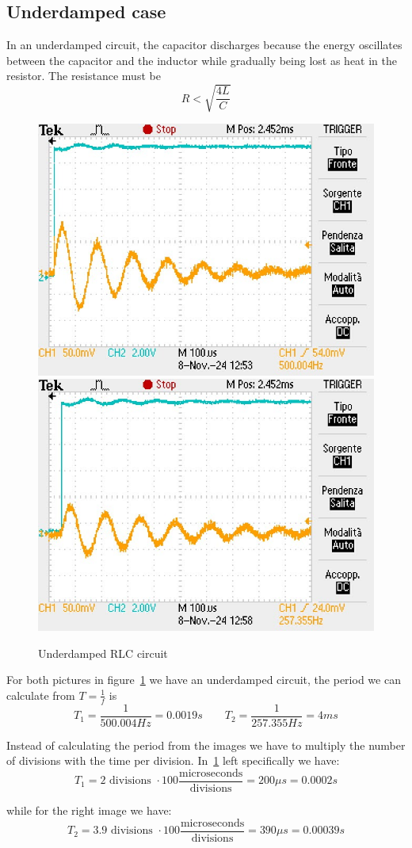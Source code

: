 \documentclass[notitlepage]{report}
\numberwithin{equation}{section}
\theoremstyle{plain}
\theoremstyle{definition}
\theoremstyle{remark}
\begin{document}
\subsection{Underdamped case}
In an underdamped circuit, the capacitor discharges because the energy
oscillates between the capacitor and the inductor while gradually being lost as
heat in the resistor. The resistance must be
\[
    R < \sqrt{\frac{4L}{C}}
\]

\begin{figure}[h!]
    \centering
    \includegraphics[width=0.45\linewidth]{figures/RLC_graph_1.jpg}
    \includegraphics[width=0.45\linewidth]{figures/RLC_graph_2.jpg}
    \caption{Underdamped RLC circuit}\label{fig:underdamped}
\end{figure}

For both pictures in figure~\ref{fig:underdamped} we have an underdamped
circuit, the period we can calculate from \(T = \frac{1}{f}\) is 
\[
  T_{1} = \frac{1}{500.004 Hz} = 0.0019s \quad \quad T_{2} = \frac{1}{257.355
  Hz} = 4 ms
\]

Instead of calculating the period from the images we have to multiply the number
of divisions with the time per division. In~\ref{fig:underdamped} left
specifically we have:
\[
  T_{1} = 2 \text{ divisions } \cdot 100
  \frac{\text{microseconds}}{\text{divisions}} = 200 \mu s = 0.0002 s
\]

while for the right image we have:
\[
  T_{2} = 3.9 \text{ divisions } \cdot 100
  \frac{\text{microseconds}}{\text{divisions}} = 390 \mu s = 0.00039 s
\]
\end{document}

